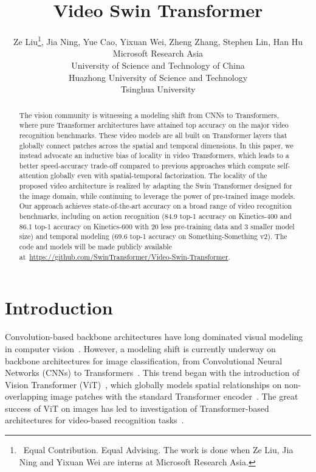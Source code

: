 \documentclass{article}
\title{Video Swin Transformer}
\author{Ze Liu\thanks{~Equal Contribution.  Equal Advising. The work is done when Ze Liu, Jia Ning and Yixuan Wei are interns at Microsoft Research Asia. }\hspace{1.2mm}, Jia Ning, Yue Cao, Yixuan Wei, Zheng Zhang, Stephen Lin, Han Hu \\
  Microsoft Research Asia\\
  University of Science and Technology of China\\
  Huazhong University of Science and Technology\\
  Tsinghua University\\
}
\begin{document}
\maketitle


\begin{abstract}
The vision community is witnessing a modeling shift from CNNs to Transformers, where pure Transformer architectures have attained top accuracy on the major video recognition benchmarks. These video models are all built on Transformer layers that globally connect patches across the spatial and temporal dimensions. In this paper, we instead advocate an inductive bias of locality in video Transformers, which leads to a better speed-accuracy trade-off compared to previous approaches which compute self-attention globally even with spatial-temporal factorization. The locality of the proposed video architecture is realized by adapting the Swin Transformer designed for the image domain, while continuing to leverage the power of pre-trained image models. Our approach achieves state-of-the-art accuracy on a broad range of video recognition benchmarks, including on action recognition (84.9 top-1 accuracy on Kinetics-400 and 86.1 top-1 accuracy on Kinetics-600 with 20 less pre-training data and 3 smaller model size) and temporal modeling (69.6 top-1 accuracy on Something-Something v2). The code and models will be made publicly available at~\url{https://github.com/SwinTransformer/Video-Swin-Transformer}.
\end{abstract}

\section{Introduction}


Convolution-based backbone architectures have long dominated visual modeling in computer vision~\cite{lecun1998lenet,krizhevsky2012alexnet,simonyan2014vgg,szegedy2015googlenet,he2015resnet,huang2017densely}. However, a modeling shift is currently underway on backbone architectures for image classification, from Convolutional Neural Networks (CNNs) to Transformers~\cite{dosovitskiy2020vit,touvron2020deit,liu2021swin}. This trend began with the introduction of Vision Transformer (ViT)~\cite{dosovitskiy2020vit,touvron2020deit}, which globally models spatial relationships on non-overlapping image patches with the standard Transformer encoder~\cite{vaswani2017attention}. The great success of ViT on images has led to investigation of Transformer-based architectures for video-based recognition tasks~\cite{arnab2021vivit, timesformer2021}.
\end{document}
